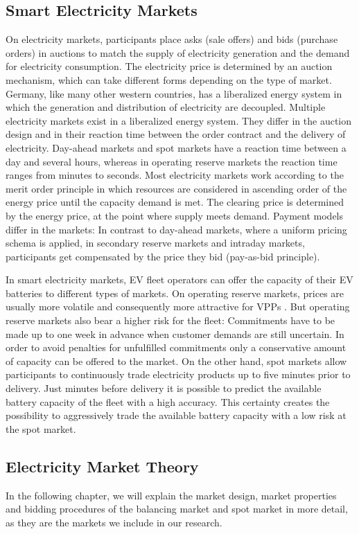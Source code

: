 \documentclass[a4paper, 12pt]{article}
\let\cite\shortcite
\begin{document}
\subsection{Smart Electricity Markets}
\label{sec:org57aa97e}
On electricity markets, participants place asks (sale offers) and bids (purchase
orders) in auctions to match the supply of electricity generation and the demand
for electricity consumption. The electricity price is determined by an auction
mechanism, which can take different forms depending on the type of market.
Germany, like many other western countries, has a liberalized energy system in
which the generation and distribution of electricity are decoupled. Multiple
electricity markets exist in a liberalized energy system. They differ in the
auction design and in their reaction time between the order contract and the
delivery of electricity. Day-ahead markets and spot markets have a reaction time
between a day and several hours, whereas in operating reserve markets the
reaction time ranges from minutes to seconds. Most electricity markets work
according to the merit order principle in which resources are considered in
ascending order of the energy price until the capacity demand is met. The
clearing price is determined by the energy price, at the point where supply
meets demand. Payment models differ in the markets: In contrast to day-ahead
markets, where a uniform pricing schema is applied, in secondary reserve markets
and intraday markets, participants get compensated by the price they bid (pay-as-bid
principle).

In smart electricity markets, EV fleet operators can offer the capacity of their
EV batteries to different types of markets. On operating reserve markets, prices
are usually more volatile and consequently more attractive for VPPs
\cite{tomic07_using_fleet_elect_drive_vehic_grid_suppor}. But operating reserve
markets also bear a higher risk for the fleet: Commitments have to be made up to
one week in advance when customer demands are still uncertain. In order to avoid
penalties for unfulfilled commitments only a conservative amount of capacity can
be offered to the market. On the other hand, spot markets allow participants to
continuously trade electricity products up to five minutes prior to delivery.
Just minutes before delivery it is possible to predict the available battery
capacity of the fleet with a high accuracy. This certainty creates the possibility
to aggressively trade the available battery capacity with a low risk at the spot
market.
\subsection{Electricity Market Theory}
\label{sec:org42fc32a}
In the following chapter, we will explain the market design, market properties
and bidding procedures of the balancing market and spot market in more detail,
as they are the markets we include in our research.
\end{document}
